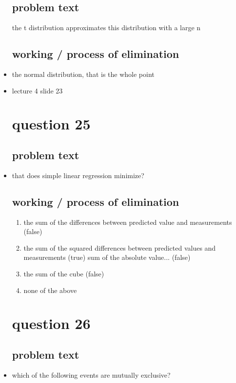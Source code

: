 \documentclass{article}
\begin{document}
\begin{itemize}
\subsection{problem text}
the t distribution approximates this distribution  with a large n

\subsection{working / process of elimination }
\item the normal distribution, that is the whole point
\item lecture 4 slide 23 

\section{question 25}
\subsection{problem text}
\item that does simple linear regression minimize?
\subsection{working / process of elimination }
\begin{enumerate}
    \item the sum of the differences between predicted value and measurements (false)
    \item the sum of the squared differences between predicted values and measurements (true) 
    \itme sum of the absolute value... (false) 
    \item the sum of the cube (false)
    \item none of the above 
\end{enumerate}


\section{question 26}
\subsection{problem text}
\item which of the following events are mutually exclusive? 

\end{itemize}
\end{document}

